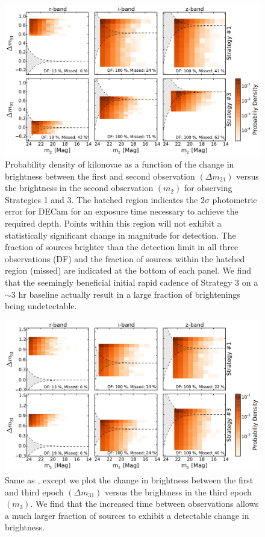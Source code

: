 \begin{figure}[t!]
\centering
\includegraphics[width=\textwidth]{./figs/chapter2/f6.pdf}
\caption{\singlespace Probability density of kilonovae as a function of the change in brightness between the first and second observation $(\Delta m_21)$ versus the brightness in the second observation $(m_2)$ for observing Strategies 1 and 3. The hatched region indicates the $2\sigma$ photometric error for DECam for an exposure time necessary to achieve the required depth. Points within this region will not exhibit a statistically significant change in magnitude for detection. The fraction of sources brighter than the detection limit in all three observations (DF) and the fraction of sources within the hatched region (missed) are indicated at the bottom of each panel. We find that the seemingly beneficial initial rapid cadence of Strategy 3 on a $\sim$3 hr baseline actually result in a large fraction of brightenings being undetectable.}
\label{fig:ch2_delm2}
\end{figure}

\begin{figure}[t!]
\centering
\includegraphics[width=\textwidth]{./figs/chapter2/f7.pdf}
\caption{\singlespace Same as , except we plot the change in brightness between the first and third epoch $(\Delta m_{31})$ versus the brightness in the third epoch $(m_3)$. We find that the increased time between observations allows a much larger fraction of sources to exhibit a detectable change in brightness.}
\label{fig:ch2_delm3}
\end{figure}

